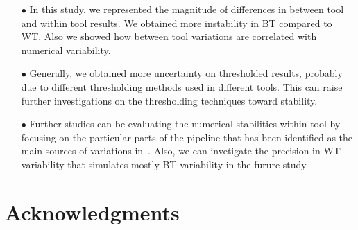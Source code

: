 \documentclass[conference]{IEEEtran}
\begin{document}
\begin{itemize}
    \item[$\bullet$ ] In this study, we represented the magnitude of differences in between tool and within tool results.
    We obtained more instability in BT compared to WT. Also we showed how between tool variations
    are correlated with numerical variability.
   
    \item[$\bullet$ ] Generally, we obtained more uncertainty on thresholded results, probably due to different thresholding
    methods used in different tools. This can raise further investigations on the thresholding techniques toward stability.
  
    \item[$\bullet$ ] Further studies can be evaluating the numerical stabilities within tool by focusing on the particular parts of 
    the pipeline that has been identified as the main sources of variations in~\cite{bowring2021isolating}.
    Also, we can invetigate the precision in WT variability that simulates mostly BT variability in the furure study.
    
\end{itemize}
  

\section{Acknowledgments} 




\end{document}
